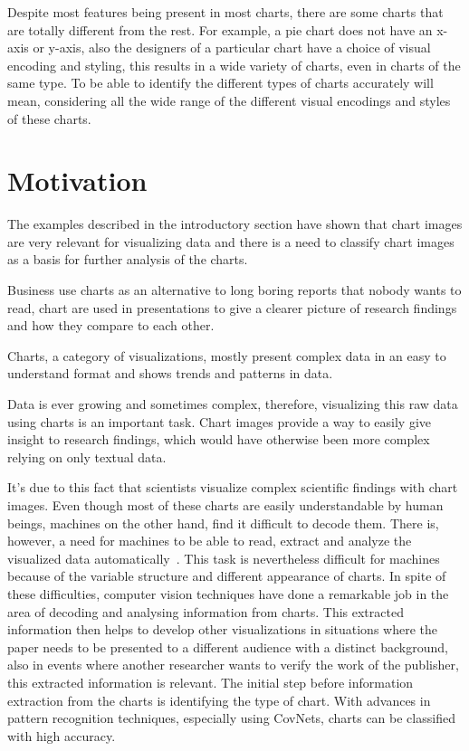 \documentclass[12pt, a4paper,oneside]{report}
\begin{document}
Despite most features being present in most charts, there are some charts that are totally different from the rest. For example, a pie chart does not have an x-axis or y-axis, also the designers of a particular chart have a choice of visual encoding and styling, this results in a wide variety of charts, even in charts of the same type. To be able to identify the different types of charts accurately will mean, considering all the wide range of the different visual encodings and styles of these charts.

\section{Motivation}
The examples described in the introductory section have shown that chart images are very relevant for visualizing data and there is a need to classify chart images as a basis for further analysis of the charts. 


Business use charts as an alternative to long boring reports that nobody wants to read, chart are used in presentations to give a clearer picture of research findings and how they compare to each other.

Charts, a category of visualizations, mostly  present complex data in an easy to understand format and shows trends and patterns in data. 

Data is ever growing and sometimes complex, therefore, visualizing this raw data using charts is an important task. Chart images provide a way to easily give insight to research findings, which would have otherwise been more complex relying on only textual data. 








It's due to this fact that scientists visualize complex scientific findings with chart images. Even though most of these charts are easily understandable by human beings, machines on the other hand, find it difficult to decode them. There is, however, a need for machines to be able to read, extract and analyze the visualized data automatically~\cite{amara2017convolutional}. This task is nevertheless difficult for machines because of the variable structure and different appearance of charts. In spite of these difficulties, computer vision techniques have done a remarkable job in the area of decoding and analysing information from charts. This extracted information then helps to develop other visualizations in situations where the paper needs to be presented to a different audience with a distinct background, also in events where another researcher wants to verify the work of the publisher, this extracted information is relevant. The initial step before information extraction from the charts is identifying the type of chart. With advances in pattern recognition techniques, especially using CovNets, charts can be classified with high accuracy.
\end{document}
